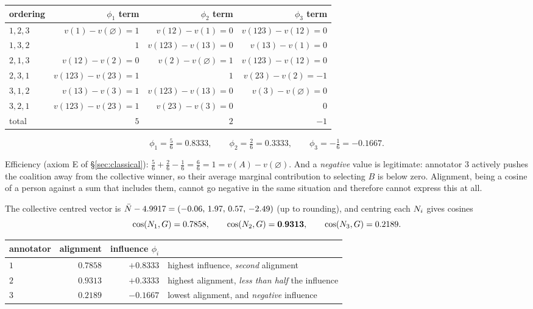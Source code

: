 \begin{center}\small
\begin{tabular}{lrrr}
\toprule
ordering & $\phi_1$ term & $\phi_2$ term & $\phi_3$ term\\
\midrule
$1,2,3$ & $v(1)-v(\varnothing)=1$ & $v(12)-v(1)=0$ & $v(123)-v(12)=0$\\
$1,3,2$ & $1$ & $v(123)-v(13)=0$ & $v(13)-v(1)=0$\\
$2,1,3$ & $v(12)-v(2)=0$ & $v(2)-v(\varnothing)=1$ & $v(123)-v(12)=0$\\
$2,3,1$ & $v(123)-v(23)=1$ & $1$ & $v(23)-v(2)=-1$\\
$3,1,2$ & $v(13)-v(3)=1$ & $v(123)-v(13)=0$ & $v(3)-v(\varnothing)=0$\\
$3,2,1$ & $v(123)-v(23)=1$ & $v(23)-v(3)=0$ & $0$\\
\midrule
total & $5$ & $2$ & $-1$\\
\bottomrule
\end{tabular}
\end{center}
\[
\phi_1 = \tfrac56 = 0.8333,\qquad
\phi_2 = \tfrac26 = 0.3333,\qquad
\phi_3 = -\tfrac16 = -0.1667 .
\]

 Efficiency (axiom E of §\ref{sec:classical}):
$\tfrac56+\tfrac26-\tfrac16 = \tfrac66 = 1 = v(A)-v(\varnothing)$. And a
\emph{negative} value is legitimate: annotator $3$ actively pushes the coalition
away from the collective winner, so their average marginal contribution to
selecting $B$ is below zero. Alignment, being a cosine of a person against a sum
that includes them, cannot go negative in the same situation and therefore cannot
express this at all.

The collective centred vector is $\bar{N} - 4.9917 =
(-0.06,\,1.97,\,0.57,\,-2.49)$ (up to rounding), and centring each $N_i$ gives
cosines
\[
\cos(N_1, G)=0.7858,\qquad
\cos(N_2, G)=\mathbf{0.9313},\qquad
\cos(N_3, G)=0.2189 .
\]


\begin{center}\small
\begin{tabular}{lrrl}
\toprule
annotator & alignment & influence $\phi_i$ & \\
\midrule
$1$ & $0.7858$ & $\mathbf{+0.8333}$ & highest influence, \emph{second} alignment\\
$2$ & $\mathbf{0.9313}$ & $+0.3333$ & highest alignment, \emph{less than half} the influence\\
$3$ & $0.2189$ & $-0.1667$ & lowest alignment, and \emph{negative} influence\\
\bottomrule
\end{tabular}
\end{center}

